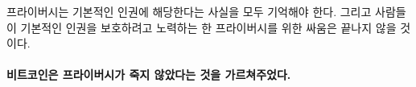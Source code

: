 \begin{comment}
	We should all remember that privacy is a fundamental human right\footnote{Universal Declaration of Human Rights, \textit{Article 12}.~\cite{article12}}. And as long
	as people exercise and defend these rights the battle for privacy is far from
	over.
\end{comment}
프라이버시는 기본적인 인권에 해당한다는 사실을 모두 기억해야 한다\cite{article12}.
그리고 사람들이 기본적인 인권을 보호하려고 노력하는 한 프라이버시를 위한 싸움은 끝나지 않을 것이다.

\paragraph{비트코인은 프라이버시가 죽지 않았다는 것을 가르쳐주었다.}

%
%
%
%

